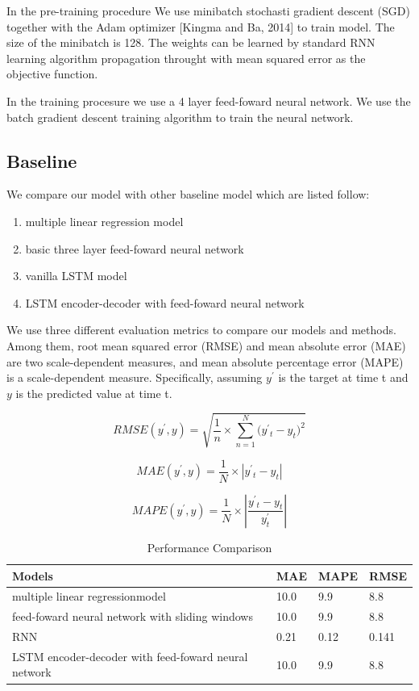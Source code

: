\documentclass[5p]{elsarticle}
\begin{document}
In the pre-training procedure We use minibatch stochasti gradient descent (SGD) together with the Adam optimizer [Kingma and Ba, 2014] to train model. The size of the minibatch is 128. The weights can be learned by standard RNN learning algorithm propagation throught with mean squared error as the objective function.

In the training procesure we use a 4 layer feed-foward neural network. We use the batch gradient descent training algorithm to train the neural network.

\subsection{Baseline}
We compare our model with other baseline model which are listed follow:
\begin{enumerate}
  \item multiple linear regression model
  \item basic three layer feed-foward neural network
  \item vanilla LSTM model
  \item LSTM encoder-decoder with feed-foward neural network
\end{enumerate}

We use three different evaluation metrics to compare our models and methods. Among them, root mean squared error (RMSE) and mean absolute error (MAE) are two scale-dependent measures, and mean absolute percentage error (MAPE) is a scale-dependent measure. Specifically, assuming $y^'$ is the target at time t and $y$ is the predicted value at time t. 


\begin{equation}
    RMSE(y^{'},y)=\sqrt{\frac{1}{n}\times{\sum_{n=1}^N(y^{'}{_t}-y_t})^2}
\end{equation}

\begin{equation}
	 MAE(y^{'},y)=\frac{1}{N}\times\left| y^{'}{_t}-y_t \right|
\end{equation}

\begin{equation}
	 MAPE(y^{'},y)=\frac{1}{N}\times\left| \frac{y^{'}{_t}-y_t}{y^'_t} \right|
\end{equation}

\begin{table}[]
\centering
\caption{Performance Comparison}
\label{my-label}
\begin{tabular}{|l|l|l|l|}
\hline
Models & MAE & MAPE & RMSE\\
\hline
multiple linear regressionmodel & 10.0 & 9.9  & 8.8 \\
\hline
feed-foward neural network with sliding windows & 10.0 & 9.9  & 8.8 \\
\hline
RNN & 0.21 & 0.12  & 0.141 \\
\hline
LSTM encoder-decoder with feed-foward neural network& 10.0 & 9.9  & 8.8 \\
\hline  
\end{tabular}
\end{table}
\end{document}
